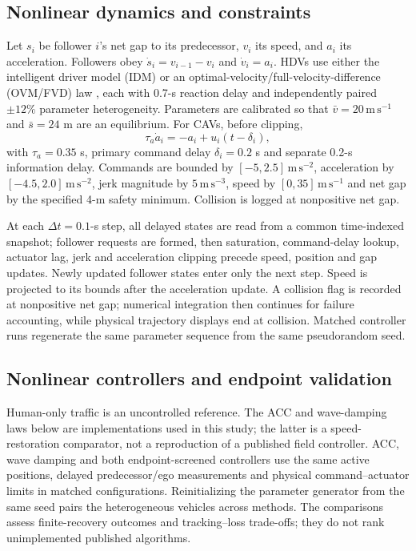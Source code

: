 \documentclass[12pt]{article}
\begin{document}
\subsection*{Nonlinear dynamics and constraints}
Let $s_i$ be follower $i$'s net gap to its predecessor, $v_i$ its speed, and $a_i$ its acceleration. Followers obey $\dot s_i=v_{i-1}-v_i$ and $\dot v_i=a_i$. HDVs use either the intelligent driver model (IDM) \cite{treiber2000congested} or an optimal-velocity/full-velocity-difference (OVM/FVD) law \cite{jiang2001full}, each with 0.7-s reaction delay and independently paired $\pm12\%$ parameter heterogeneity. Parameters are calibrated so that $\bar v=20\,\mathrm{m\,s^{-1}}$ and $\bar s=24$ m are an equilibrium. For CAVs, before clipping,
\begin{equation}
\tau_a\dot a_i=-a_i+u_i(t-\delta_i),
\end{equation}
with $\tau_a=0.35$ s, primary command delay $\delta_i=0.2$ s and separate 0.2-s information delay. Commands are bounded by $[-5,2.5]\,\mathrm{m\,s^{-2}}$, acceleration by $[-4.5,2.0]\,\mathrm{m\,s^{-2}}$, jerk magnitude by $5\,\mathrm{m\,s^{-3}}$, speed by $[0,35]\,\mathrm{m\,s^{-1}}$ and net gap by the specified 4-m safety minimum. Collision is logged at nonpositive net gap.

At each $\Delta t=0.1$-s step, all delayed states are read from a common time-indexed snapshot; follower requests are formed, then saturation, command-delay lookup, actuator lag, jerk and acceleration clipping precede speed, position and gap updates. Newly updated follower states enter only the next step. Speed is projected to its bounds after the acceleration update. A collision flag is recorded at nonpositive net gap; numerical integration then continues for failure accounting, while physical trajectory displays end at collision. Matched controller runs regenerate the same parameter sequence from the same pseudorandom seed.

\subsection*{Nonlinear controllers and endpoint validation}
Human-only traffic is an uncontrolled reference. The ACC and wave-damping laws below are implementations used in this study; the latter is a speed-restoration comparator, not a reproduction of a published field controller. ACC, wave damping and both endpoint-screened controllers use the same active positions, delayed predecessor/ego measurements and physical command--actuator limits in matched configurations. Reinitializing the parameter generator from the same seed pairs the heterogeneous vehicles across methods. The comparisons assess finite-recovery outcomes and tracking--loss trade-offs; they do not rank unimplemented published algorithms.
\end{document}
